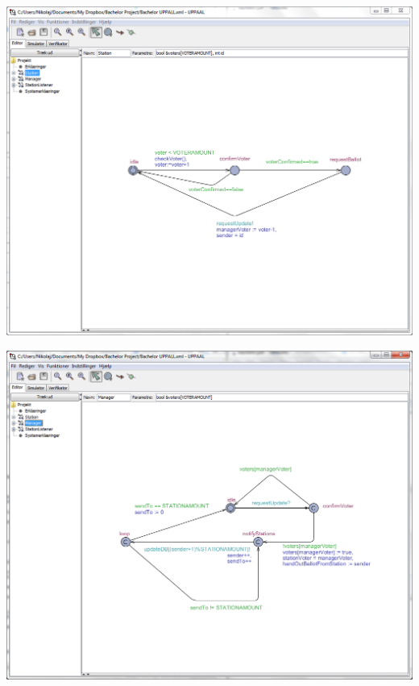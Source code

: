 \documentclass[a4paper]{report}
\begin{document}
\begin{center}
\includegraphics[width=\textwidth]{UPPAAL3.png}
\end{center}
\begin{center}
\includegraphics[width=\textwidth]{UPPAAL4.png}
\end{center}
\end{document}

